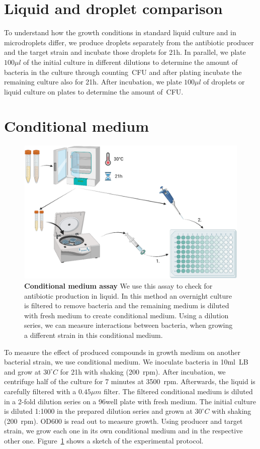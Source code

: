 \section{Liquid and droplet comparison}
To understand how the growth conditions in standard liquid culture and in microdroplets differ, we produce droplets separately from the antibiotic producer and the target strain and incubate those droplets for 21h. In parallel, we plate $100 \mu l$ of the initial culture in different dilutions to determine the amount of bacteria in the culture through counting~\gls{CFU} and after plating incubate the remaining culture also for 21h. After incubation, we plate $100 \mu l$ of droplets or liquid culture on plates to determine the amount of~\gls{CFU}.

\section{Conditional medium}
\begin{figure}
\centering
\includegraphics[width=\linewidth]{graphics/2025_09_30_droplets_fig4.png}
\caption{\textbf{Conditional medium assay} We use this assay to check for antibiotic production in liquid. In this method an overnight culture is filtered to remove bacteria and the remaining medium is diluted with fresh medium to create conditional medium. Using a dilution series, we can measure interactions between bacteria, when growing a different strain in this conditional medium.}
\label{fig:method_conditional_medium}
\end{figure}
To measure the effect of produced compounds in growth medium on another bacterial strain, we use conditional medium. We inoculate bacteria in 10ml~\gls{LB} and grow at $30^\circ C$ for 21h with shaking (200~\gls{rpm}). After incubation, we centrifuge half of the culture for 7 minutes at 3500~\gls{rpm}. Afterwards, the liquid is carefully filtered with a $0.45 \mu m$ filter. The filtered conditional medium is diluted in a 2-fold dilution series on a 96well plate with fresh medium. The initial culture is diluted 1:1000 in the prepared dilution series and grown at $30^\circ C$  with shaking (200~\gls{rpm}). OD600 is read out to measure growth. Using producer and target strain, we grow each one in its own conditional medium and in the respective other one. Figure~\ref{fig:method_conditional_medium} shows a sketch of the experimental protocol.